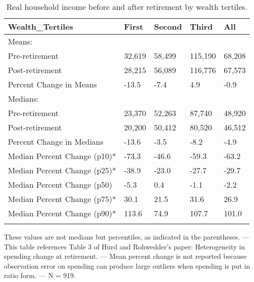 \begin{table}[tbp] \centering
{}

\caption{Real household income before and after retirement by wealth tertiles.}
\begin{tabularx}{\textwidth}{lCCCC}

\toprule
{Wealth\_Tertiles}&{First}&{Second}&{Third}&{All} \tabularnewline
\midrule\addlinespace[1.5ex]
Means:&&&& \tabularnewline
\midrule Pre-retirement&32,619&58,499&115,190&68,208 \tabularnewline
Post-retirement&28,215&56,089&116,776&67,573 \tabularnewline
Percent Change in Means&-13.5&-7.4&4.9&-0.9 \tabularnewline
\midrule Medians:&&&& \tabularnewline
\midrule Pre-retirement&23,370&52,263&87,740&48,920 \tabularnewline
Post-retirement&20,200&50,412&80,520&46,512 \tabularnewline
Percent Change in Medians&-13.6&-3.5&-8.2&-4.9 \tabularnewline
Median Percent Change (p10)*&-73.3&-46.6&-59.3&-63.2 \tabularnewline
Median Percent Change (p25)*&-38.9&-23.0&-27.7&-29.7 \tabularnewline
Median Percent Change (p50)&-5.3&0.4&-1.1&-2.2 \tabularnewline
Median Percent Change (p75)*&30.1&21.5&31.6&26.9 \tabularnewline
Median Percent Change (p90)*&113.6&74.9&107.7&101.0 \tabularnewline
\bottomrule \addlinespace[1.5ex]

\end{tabularx}
\begin{flushleft}
\footnotesize *These values are not medians but percentiles, as indicated in the parentheses. \linebreak --- \linebreak This table references Table 3 of Hurd and Rohwedder's paper: Heterogeneity in spending change at retirement. \linebreak --- \linebreak Mean percent change is not reported because observation error on spending can produce large outliers when spending is put in ratio form. \linebreak --- \linebreak N = 919.
\end{flushleft}
\end{table}
